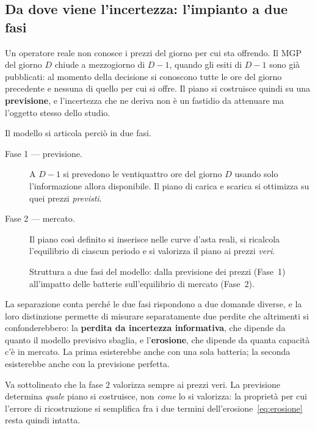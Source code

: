 \subsection{Da dove viene l'incertezza: l'impianto a due fasi}
\label{sec:due-fasi}

Un operatore reale non conosce i prezzi del giorno per cui sta offrendo. Il \ac{MGP} del
giorno $D$ chiude a mezzogiorno di $D-1$, quando gli esiti di $D-1$ sono gi\`a pubblicati:
al momento della decisione si conoscono tutte le ore del giorno precedente e nessuna di
quello per cui si offre. Il piano si costruisce quindi su una \textbf{previsione}, e
l'incertezza che ne deriva non \`e un fastidio da attenuare ma l'oggetto stesso dello studio.

Il modello si articola perci\`o in due fasi.

\begin{description}
  \item[Fase 1 --- previsione.] A $D-1$ si prevedono le ventiquattro ore del giorno $D$
    usando solo l'informazione allora disponibile. Il piano di carica e scarica si ottimizza
    su quei prezzi \emph{previsti}.
  \item[Fase 2 --- mercato.] Il piano cos\`i definito si inserisce nelle curve d'asta reali,
    si ricalcola l'equilibrio di ciascun periodo e si valorizza il piano ai prezzi
    \emph{veri}.
\end{description}

\begin{figure}[H]
\centering

\caption{Struttura a due fasi del modello: dalla previsione dei prezzi (Fase~1)
         all'impatto delle batterie sull'equilibrio di mercato (Fase~2).}
\label{fig:due-fasi}
\end{figure}

La separazione conta perch\'e le due fasi rispondono a due domande diverse, e la loro
distinzione permette di misurare separatamente due perdite che altrimenti si
confonderebbero: la \textbf{perdita da incertezza informativa}, che dipende da quanto il
modello previsivo sbaglia, e l'\textbf{erosione}, che dipende da quanta capacit\`a c'\`e in
mercato. La prima esisterebbe anche con una sola batteria; la seconda esisterebbe anche con
la previsione perfetta.

Va sottolineato che la fase 2 valorizza sempre ai prezzi veri. La previsione determina
\emph{quale} piano si costruisce, non \emph{come} lo si valorizza: la propriet\`a per cui
l'errore di ricostruzione si semplifica fra i due termini dell'erosione~\eqref{eq:erosione}
resta quindi intatta.

